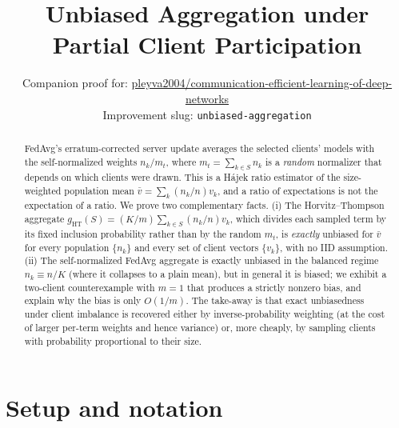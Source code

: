 \documentclass[11pt]{article}
\title{ Unbiased Aggregation under Partial Client Participation }
\author{Companion proof for: \href{https://github.com/pleyva2004/communication-efficient-learning-of-deep-networks}{pleyva2004/communication-efficient-learning-of-deep-networks} \\ \small Improvement slug: \texttt{unbiased-aggregation}}
\date{}
\theoremstyle{definition}
\theoremstyle{remark}
\begin{document}
\maketitle

\begin{abstract}
FedAvg's erratum-corrected server update averages the selected clients' models with the self-normalized weights $n_k/m_t$, where $m_t=\sum_{k\in S}n_k$ is a \emph{random} normalizer that depends on which clients were drawn. This is a H\'ajek ratio estimator of the size-weighted population mean $\bar v=\sum_k (n_k/n)v_k$, and a ratio of expectations is not the expectation of a ratio. We prove two complementary facts. (i) The Horvitz--Thompson aggregate $g_{\mathrm{HT}}(S)=(K/m)\sum_{k\in S}(n_k/n)v_k$, which divides each sampled term by its fixed inclusion probability rather than by the random $m_t$, is \emph{exactly} unbiased for $\bar v$ for every population $\{n_k\}$ and every set of client vectors $\{v_k\}$, with no IID assumption. (ii) The self-normalized FedAvg aggregate is exactly unbiased in the balanced regime $n_k\equiv n/K$ (where it collapses to a plain mean), but in general it is biased; we exhibit a two-client counterexample with $m=1$ that produces a strictly nonzero bias, and explain why the bias is only $O(1/m)$. The take-away is that exact unbiasedness under client imbalance is recovered either by inverse-probability weighting (at the cost of larger per-term weights and hence variance) or, more cheaply, by sampling clients with probability proportional to their size.
\end{abstract}

\section*{Setup and notation}
\end{document}
